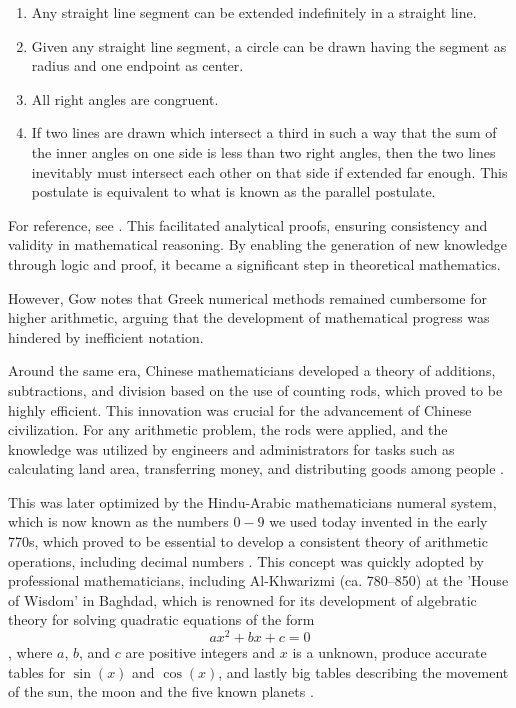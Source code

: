 \documentclass[10pt,twocolumn]{article}
\begin{document}
\begin{sloppy}
\begin{enumerate}
\item Any straight line segment can be extended indefinitely in a straight line.

\item Given any straight line segment, a circle can be drawn having the segment as radius and one endpoint as center.

\item All right angles are congruent.

\item If two lines are drawn which intersect a third in such a way that the sum of the inner angles on one side is less than two right angles, then the two lines inevitably must intersect each other on that side if extended far enough. This postulate is equivalent to what is known as the parallel postulate.
\end{enumerate}
For reference, see \cite{weissteinEuclidsPostulates}. This facilitated analytical proofs, ensuring consistency and validity in mathematical reasoning. By enabling the generation of new knowledge through logic and proof, it became a significant step
in theoretical mathematics.

However, Gow \cite{gow2010short} notes that Greek numerical methods remained cumbersome for higher arithmetic, arguing that the development of mathematical progress was hindered by inefficient notation.

Around the same era, Chinese mathematicians developed a theory of additions, subtractions, and division based on the use of counting rods, which proved to be highly efficient. This innovation was crucial for the advancement of Chinese civilization. For any arithmetic problem, the rods were applied, and the knowledge was utilized by engineers and administrators for tasks such as calculating land area, transferring money, and distributing goods among people \cite{yong1996development}.

This was later optimized by the Hindu-Arabic mathematicians numeral system, which is now known as the numbers $0-9$ we used today invented in the early 770s, which proved to be essential to develop a consistent theory of arithmetic
operations, including decimal numbers \cite{kunitzsch2003transmission}.
This concept was quickly adopted by professional mathematicians, including Al-Khwarizmi (ca. 780–850) at the 'House of Wisdom' in Baghdad, which is renowned for its development of algebratic theory for solving quadratic equations of the form $$ax^{2}
+ bx + c = 0$$, where $a$, $b$, and $c$ are positive integers and $x$ is a unknown, produce accurate tables for $\sin(x)$  and $\cos(x)$, and lastly big tables describing the movement of the sun, the moon and the five known planets \cite{van2013history}.



\end{sloppy}
\end{document}
